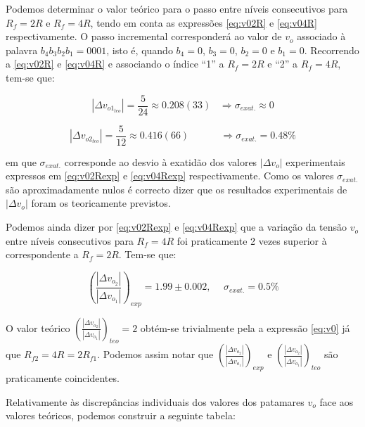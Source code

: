 \documentclass[a4paper,11pt]{report}
\begin{document}
Podemos determinar o valor teórico para o passo entre níveis consecutivos para $R_f=2R$ e $R_f=4R$, tendo em conta as expressões \ref{eq:v02R} e \ref{eq:v04R} respectivamente. O passo incremental corresponderá ao valor de $v_o$ associado à palavra $b_4b_3b_2b_1=0001$, isto é, quando $b_4=0$, $b_3=0$, $b_2=0$ e $b_1=0$.
Recorrendo a \ref{eq:v02R} e \ref{eq:v04R} e associando o índice ``1'' a $R_f=2R$ e ``2'' a $R_f=4R$, tem-se que:


\begin{equation}\label{eq:v02Rpassoteo}
\boxed{|\Delta v_{o1_{teo}}|=\frac{5}{24}\approx0.208(33)\hspace{10pt}\Rightarrow \sigma_{exat.}\approx 0}
\end{equation}

\begin{equation}\label{eq:v04Rpassoteo}
\boxed{|\Delta v_{o2_{teo}}|=\frac{5}{12}\approx0.416(66)\hspace{38pt}\Rightarrow \sigma_{exat.}=0.48\%}
\end{equation}

em que $\sigma_{exat.}$ corresponde ao desvio à exatidão dos valores $|\Delta v_o|$ experimentais expressos em \ref{eq:v02Rexp} e \ref{eq:v04Rexp} respectivamente. Como os valores  $\sigma_{exat.}$ são aproximadamente nulos é correcto dizer que os resultados experimentais de $|\Delta v_o|$ foram os teoricamente previstos.\\
\par
Podemos ainda dizer por \ref{eq:v02Rexp} e \ref{eq:v04Rexp} que a variação da tensão $v_o$ entre níveis consecutivos para $R_f=4R$ foi praticamente 2 vezes superior à correspondente a $R_f=2R$. Tem-se que:

\begin{equation}\label{eq:rel}
\boxed{\left(\frac{|\Delta v_{o_2}|}{|\Delta v_{o_{1}}|}\right)_{exp}=1.99\pm 0.002,\hspace{15pt}\sigma_{exat.}=0.5\%}
\end{equation}

O valor teórico  $\left(\frac{|\Delta v_{o_2}|}{|\Delta v_{o_{1}}|}\right)_{teo}=2$ obtém-se trivialmente pela a expressão \ref{eq:v0} já que $R_{f2}=4R=2R_{f1}$. Podemos assim notar que $\left(\frac{|\Delta v_{o_2}|}{|\Delta v_{o_{1}}|}\right)_{exp}$ e $\left(\frac{|\Delta v_{o_2}|}{|\Delta v_{o_{1}}|}\right)_{teo}$ são praticamente coincidentes.



Relativamente às discrepâncias individuais dos valores dos patamares $v_o$ face aos valores teóricos, podemos construir a seguinte tabela:
\end{document}
